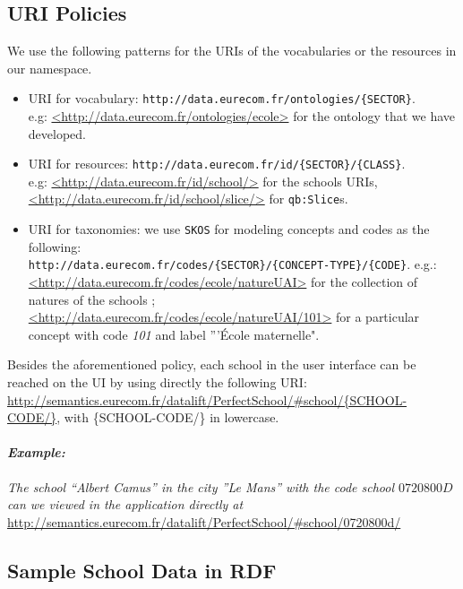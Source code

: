 \subsection{URI Policies}
We use the following patterns for the URIs of the vocabularies or the resources in our namespace.
\begin{itemize}
\item URI for vocabulary: \texttt{http://data.eurecom.fr/ontologies/\{SECTOR\}}. \\
e.g: \url{<http://data.eurecom.fr/ontologies/ecole>} for the ontology that we have developed.

\item URI for resources: \texttt{http://data.eurecom.fr/id/\{SECTOR\}/\{CLASS\}}. \\
e.g: \url{<http://data.eurecom.fr/id/school/>} for the schools URIs, \\
\url{<http://data.eurecom.fr/id/school/slice/>} for \texttt{qb:Slice}s.

\item URI for taxonomies: we use \texttt{SKOS} for modeling concepts and codes as the following: \\
\texttt{http://data.eurecom.fr/codes/\{SECTOR\}/\{CONCEPT-TYPE\}/\{CODE\}}. 
e.g.: \url{<http://data.eurecom.fr/codes/ecole/natureUAI>} for the collection of natures of the schools ; \\
        \url{<http://data.eurecom.fr/codes/ecole/natureUAI/101>} for a particular concept with code \textit{101} and label '''\'{E}cole maternelle".

\end{itemize}

Besides the aforementioned policy, each school in the user interface can be reached on the UI by using directly the following URI: 
 \url{http://semantics.eurecom.fr/datalift/PerfectSchool/#school/{SCHOOL-CODE/}}, with \{SCHOOL-CODE/\} in lowercase. 
 
\paragraph{\textit{Example:}}
\textit{The school ``Albert Camus'' in the city ''Le Mans'' with the code school $0720800D$ can we viewed in the application directly at} \url{http://semantics.eurecom.fr/datalift/PerfectSchool/#school/0720800d/}

\subsection{Sample School Data in RDF }

